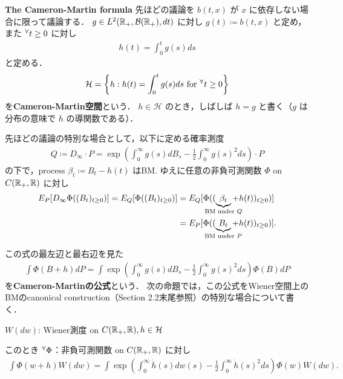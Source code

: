 \documentclass{jsarticle}
\begin{document}
\textbf{The Cameron-Martin formula}
先ほどの議論を $b(t,x)$ が $x$ に依存しない場合に限って議論する．
$g\in L^2(\mathbb{R}_+,\mathcal{B}(\mathbb{R}_+),dt)$ に対し $g(t)\coloneqq b(t,x)$ と定め，また ${}^{\forall} t\ge0$ に対し
\begin{align}
    h(t)=\int_{0}^{t}g(s)ds
\end{align}
と定める．
\begin{align}
    \mathcal{H}
    = \left\{h:h(t)=\int_{0}^{t}g(s)ds\text{ for }{}^{\forall} t\ge0\right\}
\end{align}
を\textbf{Cameron-Martin空間}という．
$h\in\mathcal{H}$ のとき，しばしば $\dot{h}=g$ と書く（$g$ は分布の意味で $h$ の導関数である）．

先ほどの議論の特別な場合として，以下に定める確率測度
\begin{align}
    Q
    \coloneqq D_\infty\cdot P
    = \exp\left(\int_0^\infty g(s)dB_s-\frac{1}{2}\int_0^\infty g(s)^2 ds\right)\cdot P
\end{align}
の下で，process $\beta_t\coloneqq B_t-h(t)$ はBM.
ゆえに任意の非負可測関数 $\Phi$ on $C(\mathbb{R}_+,\mathbb{R})$ に対し
\begin{align}
    E_P[D_\infty\Phi((B_t)_{t\ge0})]
    = E_Q[\Phi((B_t)_{t\ge0})]
    &= E_Q[\Phi((\UB{\beta_t}{\text{BM under }Q}+h(t))_{t\ge0})] \\
    &= E_P[\Phi((\UB{B_t}{\text{BM under }P}+h(t))_{t\ge0})].
\end{align}

この式の最左辺と最右辺を見た
\begin{align}
    \int \Phi(B+h)dP
    = \int\exp\left(\int_0^\infty g(s)dB_s-\frac{1}{2}\int_0^\infty g(s)^2 ds\right)\Phi(B)dP
\end{align}
を\textbf{Cameron-Martinの公式}という．
次の命題では，この公式をWiener空間上のBMのcanonical construction（Section 2.2末尾参照）の特別な場合について書く．

\begin{shadebox}
    \begin{prop}
    \label{thm:524}
        $W(dw)$: Wiener測度 on $C(\mathbb{R}_+,\mathbb{R}), h\in\mathcal{H}$

        このとき ${}^{\forall} \Phi$：非負可測関数 on $C(\mathbb{R}_+,\mathbb{R})$ に対し
        \begin{align}
            \int \Phi(w+h)W(dw)
            = \int\exp\left(\int_0^\infty \dot{h}(s)dw(s)-\frac{1}{2}\int_0^\infty \dot{h}(s)^2 ds\right)\Phi(w)W(dw).
        \end{align}
    \end{prop}  
\end{shadebox}
\end{document}
